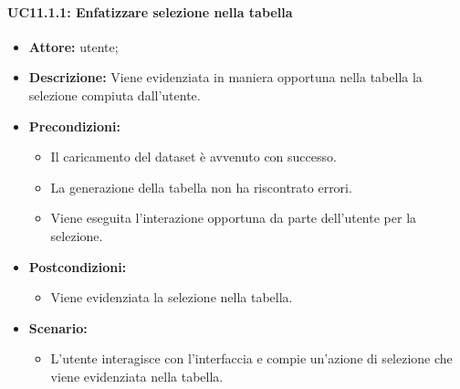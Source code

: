 \paragraph{UC11.1.1: Enfatizzare selezione nella tabella}
\begin{itemize}    
    \item \textbf{Attore:} utente;
    \item \textbf{Descrizione:} Viene evidenziata in maniera opportuna nella tabella la selezione compiuta dall'utente.
    \item \textbf{Precondizioni:}    
        \begin{itemize}
            \item Il caricamento del dataset è avvenuto con successo.
            \item La generazione della tabella non ha riscontrato errori.
            \item Viene eseguita l'interazione opportuna da parte dell'utente per la selezione.
        \end{itemize}    
    \item \textbf{Postcondizioni:}
        \begin{itemize}
            \item Viene evidenziata la selezione nella tabella.
        \end{itemize}    
    \item \textbf{Scenario:} 
        \begin{itemize}
            \item L'utente interagisce con l'interfaccia e compie un'azione di selezione che viene evidenziata nella tabella.
        \end{itemize}
\end{itemize}

\pagebreak

